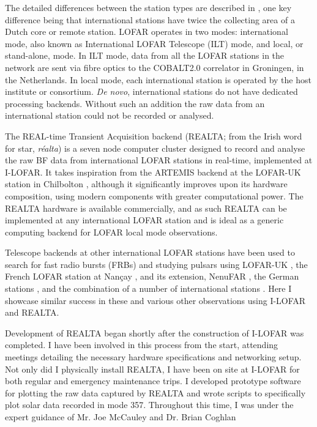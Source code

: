 The detailed differences between the station types are described in \cite{VanHaarlem2013}, one key difference being that international stations have twice the collecting area of a Dutch core or remote station. LOFAR operates in two modes: international mode, also known as International LOFAR Telescope (ILT) mode, and local, or stand-alone, mode. In ILT mode, data from all the LOFAR stations in the network are sent via fibre optics to the COBALT2.0 correlator \citep[an upgrade to COBALT1.0,][]{Broekema2018} in Groningen, in the Netherlands. In local mode, each international station is operated by the host institute or consortium. \textit{De novo}, international stations do not have dedicated processing backends. Without such an addition the raw data from an international station could not be recorded or analysed. 

The REAL-time Transient Acquisition backend (REALTA; from the Irish word for star, \textit{r\'ealta}) is a seven node computer cluster designed to record and analyse the raw BF data from international LOFAR stations in real-time, implemented at I-LOFAR. It takes inspiration from the ARTEMIS backend at the LOFAR-UK station in Chilbolton \citep{Serylak2012,Karastergiou2015}, although it significantly improves upon its hardware composition, using modern components with greater computational power. The REALTA hardware is available commercially, and as such REALTA can be implemented at any international LOFAR station and is ideal as a generic computing backend for LOFAR local mode observations.

Telescope backends at other international LOFAR stations have been used to search for fast radio bursts (FRBs) and studying pulsars using LOFAR-UK \citep[for example,][]{Karastergiou2015}, the French LOFAR station at Nançay \citep[for example,][]{Rajwade2016,Bondonneau2017}, and its extension, NenuFAR \citep[for example,][]{Bondonneau2020}, the German stations \citep[e.g][]{Donner2019, Porayko2019, Tiburzi2019}, and the combination of a number of international stations \citep[for example,][]{Mereghetti2016, Hermsen2018, Michilli2018}. Here I showcase similar success in these and various other observations using I-LOFAR and REALTA. 

Development of REALTA began shortly after the construction of I-LOFAR was completed. I have been involved in this process from the start, attending meetings detailing the necessary hardware specifications and networking setup. Not only did I physically install REALTA, I have been on site at I-LOFAR for both regular and emergency maintenance trips. I developed prototype software for plotting the raw data captured by REALTA and wrote scripts to specifically plot solar data recorded in mode 357. Throughout this time, I was under the expert guidance of Mr. Joe McCauley and Dr. Brian Coghlan

